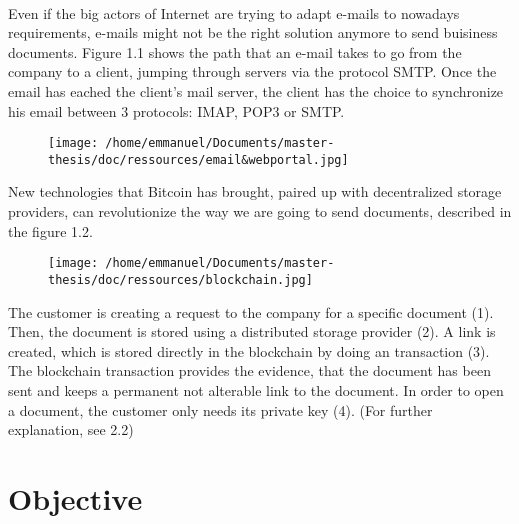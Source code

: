 \paragraph{}
 Even if the big actors of Internet are trying to adapt e-mails to nowadays requirements, e-mails might not be the right solution anymore to send buisiness documents. Figure 1.1 shows the path that an e-mail takes to go from the company to a client, jumping through servers via the protocol SMTP. Once the email has eached the client's mail server, the client has the choice to synchronize his email between 3 protocols: IMAP, POP3 or SMTP.
\begin{figure}[htp]
\centering
\texttt{[image: /home/emmanuel/Documents/master-thesis/doc/ressources/email\&webportal.jpg]}
\caption{}
\label{}
\end{figure}
\newline
New technologies that Bitcoin has brought, paired up with decentralized storage providers, can revolutionize the way we are going to send documents, described in the figure 1.2. 
\begin{figure}[htp]
\centering
\texttt{[image: /home/emmanuel/Documents/master-thesis/doc/ressources/blockchain.jpg]}
\caption{}
\label{}
\end{figure}
\newline
The customer is creating a request to the company for a specific document (1). Then, the document is stored using a distributed storage provider (2). A link is created, which is stored directly in the blockchain by doing an transaction (3). The blockchain transaction provides the evidence, that the document has been sent and keeps a permanent not alterable link to the document. In order to open a document, the customer only needs its private key (4). (For further explanation, see 2.2)

\section{Objective}
